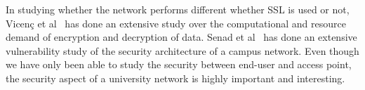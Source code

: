 \documentclass[letterpaper,twocolumn,10pt]{article}
\begin{document}
In studying whether the network performs different whether SSL is used or not, Vicen\c{c} et al~\cite{SSL} has done an extensive study over the computational and resource demand of encryption and decryption of data. Senad et al~\cite{Campus2011} has done an extensive vulnerability study of the security architecture of a campus network. Even though we have only been able to study the security between end-user and access point, the security aspect of a university network is highly important and interesting.


{\footnotesize 
}


\end{document}
